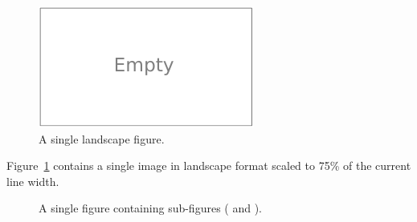 \begin{figure}
  \centering
  \includegraphics[draft=false,width=0.75\linewidth]{figures/empty_lscape}
  \caption[A single landscape figure]{A single landscape figure.}
  \label{fig:how-to:figures:lscape}
\end{figure}
Figure~\ref{fig:how-to:figures:lscape} contains a single image in landscape format scaled to 75\% of
the current line width.
\begin{figure}
  \centering
  \caption[A single portrait figure]{A single figure containing sub-figures
    (\protect{} and
    \protect{})\@.}
  \label{fig:how-to:figures:portait}
\end{figure}
